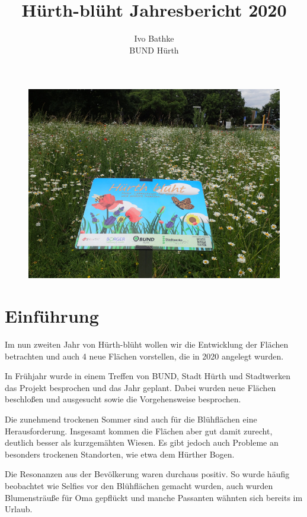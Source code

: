 \documentclass[11pt]{article}
\title{\textbf{Hürth-blüht Jahresbericht 2020}}
\author{Ivo Bathke\\
		BUND Hürth\\}
\date{}
\begin{document}
\maketitle

\begin{figure}[h!]
  \includegraphics[width=\linewidth]{img/titel.jpg}
\end{figure}

\newpage

\section{Einführung}
Im nun zweiten Jahr von Hürth-blüht wollen wir die Entwicklung der Flächen betrachten und auch 4 neue Flächen vorstellen, die in 2020 angelegt wurden.

In Frühjahr wurde in einem Treffen von BUND, Stadt Hürth und Stadtwerken das Projekt besprochen und das Jahr geplant. Dabei wurden neue Flächen beschloßen und ausgesucht sowie die Vorgehensweise besprochen.

Die zunehmend trockenen Sommer sind auch für die Blühflächen eine Herausforderung. Insgesamt kommen die Flächen aber gut damit zurecht, deutlich besser als kurzgemähten Wiesen.
Es gibt jedoch auch Probleme an besonders trockenen Standorten, wie etwa dem Hürther Bogen.

Die Resonanzen aus der Bevölkerung waren durchaus positiv. So wurde häufig beobachtet wie Selfies vor den Blühflächen gemacht wurden, auch wurden Blumensträuße für Oma gepflückt und manche Passanten wähnten sich bereits im Urlaub.
\end{document}

